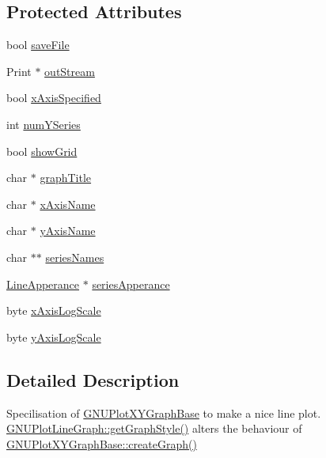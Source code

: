 \subsection*{Protected Attributes}
\begin{DoxyCompactItemize}
\item 
bool \hyperlink{class_serial_graph_a24202e0a7a8bac5ec1cfd92bf796e078}{save\+File}
\item 
Print $\ast$ \hyperlink{class_serial_graph_aec32289a9393e98bf80d44406e5c207d}{out\+Stream}
\item 
bool \hyperlink{class_serial_graph_a4dbd9cf190c591fb4f2f46a50d937199}{x\+Axis\+Specified}
\item 
int \hyperlink{class_serial_graph_ab40c430e06102b9624736173d4a58596}{num\+Y\+Series}
\item 
bool \hyperlink{class_serial_graph_ad61d5ea29eacc1611c5addc94714f1e2}{show\+Grid}
\item 
char $\ast$ \hyperlink{class_serial_graph_a0b33d43c2bb54340ef1f90b5f76d7aea}{graph\+Title}
\item 
char $\ast$ \hyperlink{class_serial_graph_a5f5bf85ed361ff567d0888eaa73e269c}{x\+Axis\+Name}
\item 
char $\ast$ \hyperlink{class_serial_graph_a08452a56c74ec5f5473b64605d555339}{y\+Axis\+Name}
\item 
char $\ast$$\ast$ \hyperlink{class_serial_graph_a2307e40e27249f44bbe14776dc68c561}{series\+Names}
\item 
\hyperlink{struct_line_apperance}{Line\+Apperance} $\ast$ \hyperlink{class_serial_graph_a8d743f9eeeca69a988d2159a405e4253}{series\+Apperance}
\item 
byte \hyperlink{class_serial_graph_afc2ca72fdfe2bc5e3159c9e910a8f81e}{x\+Axis\+Log\+Scale}
\item 
byte \hyperlink{class_serial_graph_a1f0424857ec14c176747b3ddb0768eee}{y\+Axis\+Log\+Scale}
\end{DoxyCompactItemize}


\subsection{Detailed Description}
Specilisation of \hyperlink{class_g_n_u_plot_x_y_graph_base}{G\+N\+U\+Plot\+X\+Y\+Graph\+Base} to make a nice line plot. \hyperlink{class_g_n_u_plot_line_graph_a8f8b19efd8d8f4f25ccc41635e332593}{G\+N\+U\+Plot\+Line\+Graph\+::get\+Graph\+Style()} alters the behaviour of \hyperlink{class_g_n_u_plot_x_y_graph_base_a8389f830ff330dfb705e00d31053e130}{G\+N\+U\+Plot\+X\+Y\+Graph\+Base\+::create\+Graph()} 

